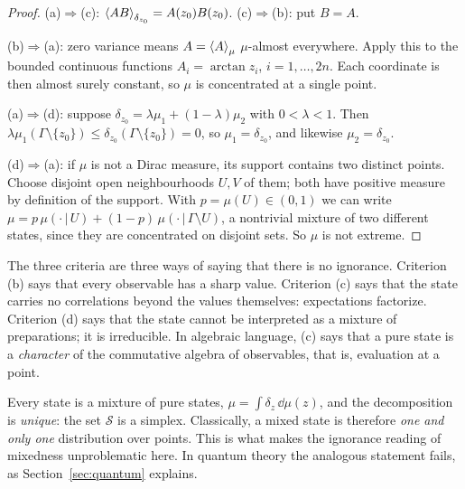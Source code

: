 \begin{proof}
(a)$\Rightarrow$(c): $\left\langle AB\right\rangle_{\delta_{z_0}}=A(z_0)B(z_0)$. (c)$\Rightarrow$(b): put $B=A$.

(b)$\Rightarrow$(a): zero variance means $A=\left\langle A\right\rangle_\mu$ $\mu$-almost everywhere. Apply this to the bounded continuous functions $A_i=\arctan z_i$, $i=1,\dots,2n$. Each coordinate is then almost surely constant, so $\mu$ is concentrated at a single point.

(a)$\Rightarrow$(d): suppose $\delta_{z_0}=\lambda\mu_1+(1-\lambda)\mu_2$ with $0<\lambda<1$. Then $\lambda\mu_1(\Gamma\setminus\{z_0\})\le\delta_{z_0}(\Gamma\setminus\{z_0\})=0$, so $\mu_1=\delta_{z_0}$, and likewise $\mu_2=\delta_{z_0}$.

(d)$\Rightarrow$(a): if $\mu$ is not a Dirac measure, its support contains two distinct points. Choose disjoint open neighbourhoods $U,V$ of them; both have positive measure by definition of the support. With $p=\mu(U)\in(0,1)$ we can write $\mu=p\,\mu(\cdot\,|\,U)+(1-p)\,\mu(\cdot\,|\,\Gamma\setminus U)$, a nontrivial mixture of two different states, since they are concentrated on disjoint sets. So $\mu$ is not extreme.
\end{proof}

The three criteria are three ways of saying that there is no ignorance. Criterion (b) says that every observable has a sharp value. Criterion (c) says that the state carries no correlations beyond the values themselves: expectations factorize. Criterion (d) says that the state cannot be interpreted as a mixture of preparations; it is irreducible. In algebraic language, (c) says that a pure state is a \emph{character} of the commutative algebra of observables, that is, evaluation at a point.

\begin{remark}
Every state is a mixture of pure states, $\mu=\int\delta_z\,\dd\mu(z)$, and the decomposition is \emph{unique}: the set $\mathcal S$ is a simplex. Classically, a mixed state is therefore \emph{one and only one} distribution over points. This is what makes the ignorance reading of mixedness unproblematic here. In quantum theory the analogous statement fails, as Section~\ref{sec:quantum} explains.
\end{remark}

